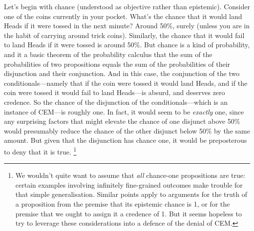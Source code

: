 \documentclass[If.tex]{subfiles}
\begin{document}
Let's begin with chance (understood as objective rather than epistemic). Consider one of the coins currently in your pocket. What's the chance that it would land Heads if it were tossed in the next minute? Around 50\%, surely (unless you are in the habit of carrying around trick coins). Similarly, the chance that it would fail to land Heads if it were tossed is around 50\%. But chance is a kind of probability, and it a basic theorem of the probability calculus that the sum of the probabilities of two propositions equals the sum of the probabilities of their disjunction and their conjunction. And in this case, the conjunction of the two conditionals---namely that if the coin were tossed it would land Heads, and if the coin were tossed it would fail to land Heads---is absurd, and deserves zero credence. So the chance of the disjunction of the conditionals---which is an instance of CEM---is roughly one. In fact, it would seem to be \emph{exactly} one, since any surprising factors that might elevate the chance of one disjunct above 50\% would presumably reduce the chance of the other disjunct below 50\% by the same amount. But given that the disjunction has chance one, it would be preposterous to deny that it is true.%
\footnote{We wouldn't quite want to assume that \emph{all} chance-one propositions are true: certain examples involving infinitely fine-grained outcomes make trouble for that simple generalisation. Similar points apply to arguments for the truth of a proposition from the premise that its epistemic chance is 1, or for the premise that we ought to assign it a credence of 1. But it seems hopeless to try to leverage these considerations into a defence of the denial of CEM.}


\begin{comment}
	We can generate a similar pattern of judgments by considering the chances at a certain past time of counterfactuals concerning times in the future of that time. For example, if you didn't toss a certain coin yesterday, it seems that the chance two days ago that it would land Heads if it were tossed yesterday was in the region of 50\%, as was the chance two days ago that it would fail to land Heads if it were tossed yesterday, so again, the chance of the disjunction of these counterfactuals would seem to have been 1.
\end{comment}
\end{document}
